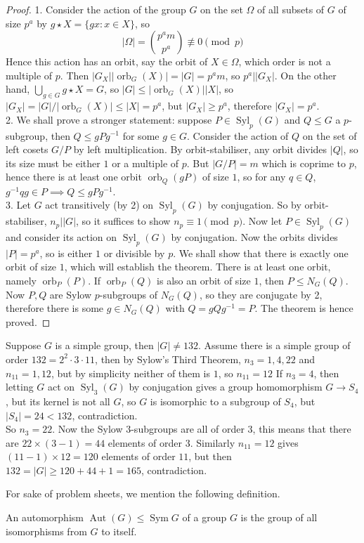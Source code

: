 \begin{proof}
    1. Consider the action of the group $G$ on the set $\Omega$ of all subsets of $G$ of size $p^a$ by $g\star X=\{gx:x\in X\}$, so
    $$|\Omega|=\binom{p^am}{p^a}\not\equiv 0\pmod{p}$$
    Hence this action has an orbit, say the orbit of $X\in\Omega$, which order is not a multiple of $p$.
    Then $|G_X||\operatorname{orb}_G(X)|=|G|=p^am$, so $p^a||G_X|$.
    On the other hand, $\bigcup_{g\in G}g\star X=G$, so $|G|\le |\operatorname{orb}_G(X)||X|$, so $|G_X|=|G|/|\operatorname{orb}_G(X)|\le |X|=p^a$, but $|G_X|\ge p^a$, therefore $|G_X|=p^a$.\\
    2. We shall prove a stronger statement: suppose $P\in\operatorname{Syl}_p(G)$ and $Q\le G$ a $p$-subgroup, then $Q\le gPg^{-1}$ for some $g\in G$.
    Consider the action of $Q$ on the set of left cosets $G/P$ by left multiplication.
    By orbit-stabiliser, any orbit divides $|Q|$, so its size must be either $1$ or a multiple of $p$.
    But $|G/P|=m$ which is coprime to $p$, hence there is at least one orbit $\operatorname{orb}_Q(gP)$ of size $1$, so for any $q\in Q$, $g^{-1}qg\in P\implies Q\le gPg^{-1}$.\\
    3. Let $G$ act transitively (by 2) on $\operatorname{Syl}_p(G)$ by conjugation.
    So by orbit-stabiliser, $n_p||G|$, so it suffices to show $n_p\equiv 1\pmod{p}$.
    Now let $P\in\operatorname{Syl}_p(G)$ and consider its action on $\operatorname{Syl}_p(G)$ by conjugation.
    Now the orbits divides $|P|=p^a$, so is either $1$ or divisible by $p$.
    We shall show that there is exactly one orbit of size $1$, which will establish the theorem.
    There is at least one orbit, namely $\operatorname{orb}_P(P)$.
    If $\operatorname{orb}_P(Q)$ is also an orbit of size $1$, then $P\le N_G(Q)$.
    Now $P,Q$ are Sylow $p$-subgroups of $N_G(Q)$, so they are conjugate by 2, therefore there is some $g\in N_G(Q)$ with $Q=gQg^{-1}=P$.
    The theorem is hence proved.
\end{proof}
\begin{example}
    Suppose $G$ is a simple group, then $|G|\neq 132$.
    Assume there is a simple group of order $132=2^2\cdot 3\cdot 11$, then by Sylow's Third Theorem, $n_3=1,4,22$ and $n_{11}=1,12$, but by simplicity neither of them is $1$, so $n_{11}=12$
    If $n_3=4$, then letting $G$ act on $\operatorname{Syl}_3(G)$ by conjugation gives a group homomorphism $G\to S_4$, but its kernel is not all $G$, so $G$ is isomorphic to a subgroup of $S_4$, but $|S_4|=24<132$, contradiction.\\
    So $n_3=22$.
    Now the Sylow $3$-subgroups are all of order $3$, this means that there are $22\times (3-1)=44$ elements of order $3$.
    Similarly $n_{11}=12$ gives $(11-1)\times 12=120$ elements of order $11$, but then $132=|G|\ge 120+44+1=165$, contradiction.
\end{example}
For sake of problem sheets, we mention the following definition.
\begin{definition}
    An automorphism $\operatorname{Aut}(G)\le\operatorname{Sym}G$ of a group $G$ is the group of all isomorphisms from $G$ to itself.
\end{definition}